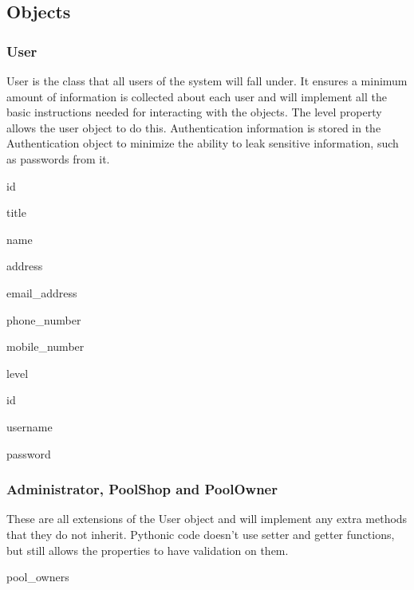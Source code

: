 \subsection{Objects}
\subsubsection{User}
\par
User is the class that all users of the system will fall under. It ensures a minimum amount of information is collected about each user and will implement all the basic instructions needed for interacting with the objects. The level property allows the user object to do this. Authentication information is stored in the Authentication object to minimize the ability to leak sensitive information, such as passwords from it.

{
	\item id
	\item title
	\item name
	\item address 
	\item email\_address
	\item phone\_number
	\item mobile\_number
	\item level
}
{
	\item
}

{
	\item id
	\item username
	\item password
}
{
	\item
}

\subsubsection{Administrator, PoolShop and PoolOwner}
\par
These are all extensions of the User object and will implement any extra methods that they do not inherit. Pythonic code doesn't use setter and getter functions, but still allows the properties to have validation on them.

{
	\item 
}
{
	\item
}

{
	\item pool\_owners
}
{
	\item 
}


